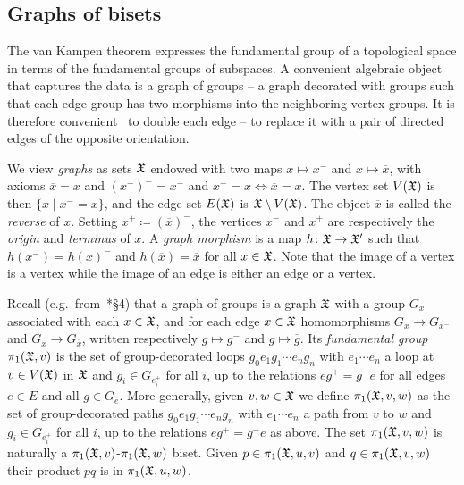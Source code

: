 \documentclass{amsart}
\begin{document}
\subsection{Graphs of bisets}
The van Kampen theorem expresses the fundamental group of a
topological space in terms of the fundamental groups of subspaces. A
convenient algebraic object that captures the data is a graph of
groups -- a graph decorated with groups such that each edge group has
two morphisms into the neighboring vertex groups. It is therefore
convenient~\cite{serre:trees} to double each edge -- to replace it with
a pair of directed edges of the opposite orientation.

We view \emph{graphs} as sets ${\mathfrak X}$ endowed with two maps
$x\mapsto x^-$ and $x\mapsto\overline x$, with axioms
$\overline{\overline x}=x$ and $(x^-)^-=x^-$ and
$x^-=x\Leftrightarrow\overline x=x$. The vertex set $V({\mathfrak X})$ is then
$\{x\mid x^-=x\}$, and the edge set $E({\mathfrak X})$ is ${\mathfrak X}\setminus
V({\mathfrak X})$. The object $\overline x$ is called the \emph{reverse} of
$x$. Setting $x^+\coloneqq (\overline x)^-$, the vertices $x^-$ and
$x^+$ are respectively the \emph{origin} and \emph{terminus} of $x$. A
\emph{graph morphism} is a map $h\colon {\mathfrak X} \to {\mathfrak X}'$ such that
$h(x^-)=h(x)^-$ and $h(\overline x)=\overline x$ for all $x\in
{\mathfrak X}$. Note that the image of a vertex is a vertex while the image of
an edge is either an edge or a vertex.

Recall (e.g.\ from~\cite{serre:trees}*{\S4}) that a graph of groups is
a graph ${\mathfrak X}$ with a group $G_x$ associated with each $x\in{\mathfrak X}$, and
for each edge $x\in{\mathfrak X}$ homomorphisms $G_x\to G_{x^-}$ and
$G_x\to G_{\overline x}$, written respectively $g\mapsto g^-$ and
$g\mapsto\overline g$.  Its \emph{fundamental group} $\pi_1({\mathfrak X},v)$ is
the set of group-decorated loops $g_0e_1g_1\cdots e_n g_n$ with
$e_1\cdots e_n$ a loop at $v\in V({\mathfrak X})$ in ${\mathfrak X}$ and
$g_i\in G_{e_i^+}$ for all $i$, up to the relations $e g^+=g^-e$ for
all edges $e\in E$ and all $g\in G_e$. More generally, given
$v, w \in {\mathfrak X}$ we define $\pi_1({\mathfrak X}, v,w )$ as the set of
group-decorated paths $g_0e_1g_1\cdots e_n g_n$ with $e_1\cdots e_n$ a
path from $v$ to $w$ and $g_i\in G_{e_i^+}$ for all $i$, up to the
relations $e g^+=g^-e$ as above. The set $\pi_1({\mathfrak X},v,w)$ is naturally
a $\pi_1({\mathfrak X},v)$-$\pi_1({\mathfrak X},w)$ biset. Given $p\in \pi_1({\mathfrak X},u,v)$ and
$q\in \pi_1({\mathfrak X},v,w)$ their product $p q$ is in $\pi_1({\mathfrak X},u,w)$.
\end{document}

